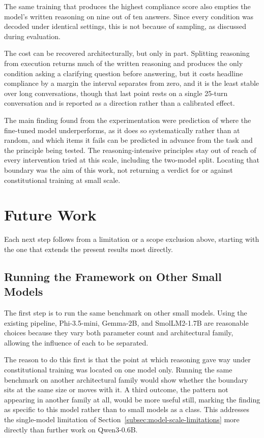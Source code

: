The same training that produces the highest compliance score also empties the model's written reasoning on nine out of ten answers. Since every condition was decoded under identical settings, this is not because of sampling, as discussed during evaluation.

The cost can be recovered architecturally, but only in part. Splitting reasoning from execution returns much of the written reasoning and produces the only condition asking a clarifying question before answering, but it costs headline compliance by a margin the interval separates from zero, and it is the least stable over long conversations, though that last point rests on a single 25-turn conversation and is reported as a direction rather than a calibrated effect.

The main finding found from the experimentation were prediction of where the fine-tuned model underperforms, as it does so systematically rather than at random, and which items it fails can be predicted in advance from the task and the principle being tested. The reasoning-intensive principles stay out of reach of every intervention tried at this scale, including the two-model split. Locating that boundary was the aim of this work, not returning a verdict for or against constitutional training at small scale.

\section{Future Work}
\label{sec:conclusion-future}

Each next step follows from a limitation or a scope exclusion above, starting with the one that extends the present results most directly.

\subsection{Running the Framework on Other Small Models}
\label{subsec:conclusion-future-extensions}

The first step is to run the same benchmark on other small models. Using the existing pipeline, Phi-3.5-mini, Gemma-2B, and SmolLM2-1.7B are reasonable choices because they vary both parameter count and architectural family, allowing the influence of each to be separated.

The reason to do this first is that the point at which reasoning gave way under constitutional training was located on one model only. Running the same benchmark on another architectural family would show whether the boundary sits at the same size or moves with it. A third outcome, the pattern not appearing in another family at all, would be more useful still, marking the finding as specific to this model rather than to small models as a class. This addresses the single-model limitation of Section~\ref{subsec:model-scale-limitations} more directly than further work on Qwen3-0.6B.

